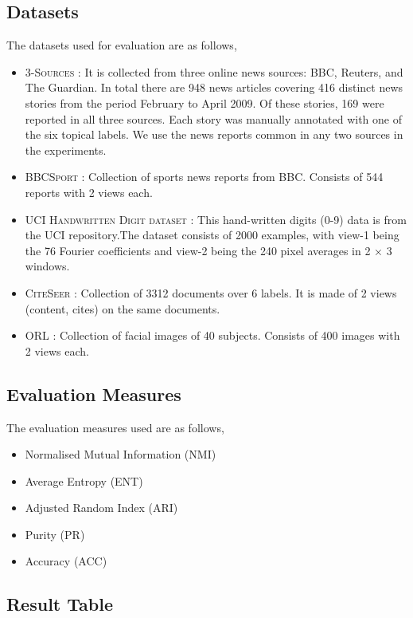 \documentclass[a4paper]{article}
\begin{document}
	\subsection{Datasets}
	
	The datasets used for evaluation are as follows,
	\begin{itemize}
	\item \textsc{3-Sources} : It is collected from three online news sources: BBC, Reuters, and The Guardian. In total there are 948 news articles covering 416 distinct news stories from the period February to April 2009. Of these stories, 169 were reported in all three sources. Each story was manually annotated with one of the six topical labels. We use the news reports common in any two sources in the experiments.
	\item \textsc{BBCSport} : Collection of sports news reports from BBC. Consists of 544 reports with 2 views each.
	\item \textsc{UCI Handwritten Digit dataset} : This hand-written digits (0-9) data is from the UCI repository.The dataset consists of 2000 examples, with view-1 being the 76 Fourier coefficients and view-2 being the 240 pixel averages in 2 × 3 windows.	
	\item \textsc{CiteSeer} : Collection of 3312 documents over 6 labels. It is made of 2 views (content, cites) on the same documents.
	\item \textsc{ORL} : Collection of facial images of 40 subjects. Consists of 400 images with 2 views each.	
	\end{itemize}

	\subsection{Evaluation Measures}

	The evaluation measures used are as follows,
	\begin{itemize}
	\item {Normalised Mutual Information (NMI)}
	\item {Average Entropy (ENT)}
	\item {Adjusted Random Index (ARI)}
	\item {Purity (PR)}
	\item {Accuracy (ACC)}
	\end{itemize}
	

	\subsection{Result Table}	
\end{document}
